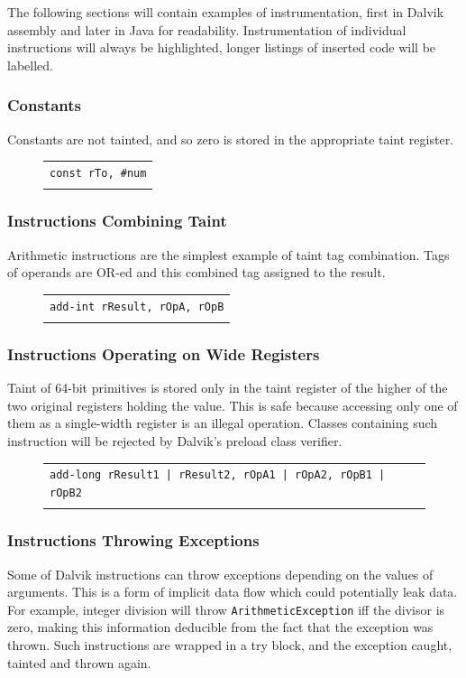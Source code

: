 \documentclass[12pt,twoside,notitlepage]{report}
\newcommand{\centerbox}[1] {
	\begin{center}
	\begin{footnotesize}
	\begin{tabular}{l}
	#1
	\end{tabular}
	\end{footnotesize}
	\end{center}
}
\newcommand{\highlight}[1]{\colorbox{lightOrange}{\strut #1}}
\newcommand{\asm}[1] {\texttt{#1}}
\newcommand{\asmExtra}[1] {\texttt{\highlight{#1}}}
\begin{document}
The following sections will contain examples of instrumentation, first in Dalvik assembly and later in Java for readability. Instrumentation of individual instructions will always be highlighted, longer listings of inserted code will be labelled.

\subsubsection{Constants}

Constants are not tainted, and so zero is stored in the appropriate taint register.

	\begin{figure}[H]
		\centerbox{
			\asm{const rTo, \#num} \\
			\asmExtra{const tTo, \#0}
		}
	\end{figure}

\subsubsection{Instructions Combining Taint}

Arithmetic instructions are the simplest example of taint tag combination. Tags of operands are OR-ed and this combined tag assigned to the result.

	\begin{figure}[H]
		\centerbox{
			\asm{add-int~rResult, rOpA, rOpB} \\
			\asmExtra{or-int~~tResult, tOpA, tOpB}
		}
	\end{figure}

\subsubsection{Instructions Operating on Wide Registers}

Taint of 64-bit primitives is stored only in the taint register of the higher of the two original registers holding the value. This is safe because accessing only one of them as a single-width register is an illegal operation. Classes containing such instruction will be rejected by Dalvik's preload class verifier.

	\begin{figure}[H]
		\centerbox{
			\asm{add-long rResult1 | rResult2, rOpA1 | rOpA2, rOpB1 | rOpB2} \\
			\asmExtra{or-int~~~tResult1, tOpA1, tOpB1}
		}
	\end{figure}

\subsubsection{Instructions Throwing Exceptions}
\label{section:Preparation_Analysis_Throwing}
Some of Dalvik instructions can throw exceptions depending on the values of arguments. This is a form of implicit data flow which could potentially leak data. For example, integer division will throw \verb$ArithmeticException$ iff the divisor is zero, making this information deducible from the fact that the exception was thrown. Such instructions are wrapped in a try block, and the exception caught, tainted and thrown again.
\end{document}

